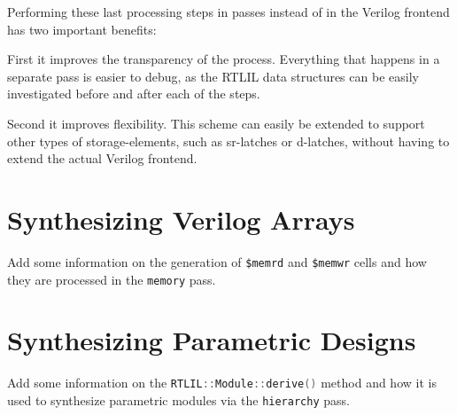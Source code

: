 Performing these last processing steps in passes instead of in the Verilog frontend has two important benefits:

First it improves the transparency of the process. Everything that happens in a separate pass is easier to debug,
as the RTLIL data structures can be easily investigated before and after each of the steps.

Second it improves flexibility. This scheme can easily be extended to support other types of storage-elements, such
as sr-latches or d-latches, without having to extend the actual Verilog frontend.

\section{Synthesizing Verilog Arrays}

\begin{fixme}
Add some information on the generation of {\tt \$memrd} and {\tt \$memwr} cells
and how they are processed in the {\tt memory} pass.
\end{fixme}

\section{Synthesizing Parametric Designs}

\begin{fixme}
Add some information on the \lstinline[language=C++]{RTLIL::Module::derive()} method and how it
is used to synthesize parametric modules via the {\tt hierarchy} pass.
\end{fixme}

